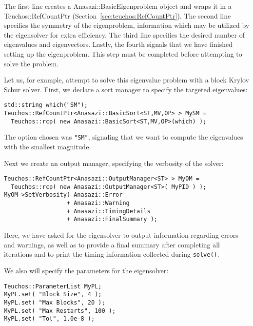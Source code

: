 The first line creates a Anasazi::BasicEigenproblem object and wraps it in a
Teuchos::RefCountPtr (Section~\ref{sec:teuchos:RefCountPtr}). The second line
specifies the symmetry of the eigenproblem, information which may be utilized by
the eigensolver for extra efficiency. The third line specifies the desired
number of eigenvalues and eigenvectors. Lastly, the fourth signals that we have
finished setting up the eigenproblem. This step must be completed before
attempting to solve the problem.

Let us, for example, attempt to solve this eigenvalue problem with a
block Krylov Schur solver. First, we declare a sort manager to specify the
targeted eigenvalues:
\begin{verbatim}
std::string which("SM");
Teuchos::RefCountPtr<Anasazi::BasicSort<ST,MV,OP> > MySM =
  Teuchos::rcp( new Anasazi::BasicSort<ST,MV,OP>(which) );
\end{verbatim}
The option chosen was \verb!"SM"!, signaling that we want to compute
the eigenvalues with the smallest magnitude. 

Next we create an output manager, specifying the verbosity of the
solver:
\begin{verbatim}
Teuchos::RefCountPtr<Anasazi::OutputManager<ST> > MyOM = 
  Teuchos::rcp( new Anasazi::OutputManager<ST>( MyPID ) );
MyOM->SetVerbosity( Anasazi::Error 
                  + Anasazi::Warning 
                  + Anasazi::TimingDetails 
                  + Anasazi::FinalSummary );
\end{verbatim}
Here, we have asked for the eigensolver to output information regarding errors
and warnings, as well as to provide a final summary after completing all
iterations and to print the timing information collected during \verb!solve()!.

We also will specify the parameters for the eigensolver:
\begin{verbatim}
Teuchos::ParameterList MyPL;
MyPL.set( "Block Size", 4 );
MyPL.set( "Max Blocks", 20 );
MyPL.set( "Max Restarts", 100 );
MyPL.set( "Tol", 1.0e-8 );
\end{verbatim}

